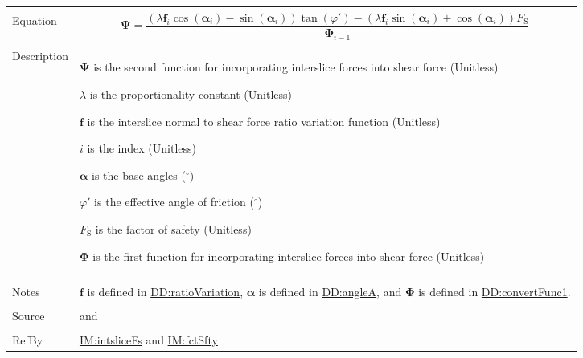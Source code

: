 \documentclass[12pt]{article}
\begin{document}
\begin{minipage}{\textwidth}
\begin{tabular}{>{\raggedright}p{}>{\raggedright\arraybackslash}p{}}
\\ \midrule \\
Equation & \begin{displaymath}
           \symbf{Ψ}=\frac{\left(λ {\symbf{f}}_{i} \cos\left({\symbf{α}}_{i}\right)-\sin\left({\symbf{α}}_{i}\right)\right) \tan\left(φ'\right)-\left(λ {\symbf{f}}_{i} \sin\left({\symbf{α}}_{i}\right)+\cos\left({\symbf{α}}_{i}\right)\right) {F_{\text{S}}}}{{\symbf{Φ}}_{i-1}}
           \end{displaymath}
\\ \midrule \\
Description & \begin{symbDescription}
              \item{$\symbf{Ψ}$ is the second function for incorporating interslice forces into shear force (Unitless)}
              \item{$λ$ is the proportionality constant (Unitless)}
              \item{$\symbf{f}$ is the interslice normal to shear force ratio variation function (Unitless)}
              \item{$i$ is the index (Unitless)}
              \item{$\symbf{α}$ is the base angles (${{}^{\circ}}$)}
              \item{$φ'$ is the effective angle of friction (${{}^{\circ}}$)}
              \item{${F_{\text{S}}}$ is the factor of safety (Unitless)}
              \item{$\symbf{Φ}$ is the first function for incorporating interslice forces into shear force (Unitless)}
              \end{symbDescription}
\\ \midrule \\
Notes & $\symbf{f}$ is defined in \hyperref[DD:ratioVariation]{DD:ratioVariation}, $\symbf{α}$ is defined in \hyperref[DD:angleA]{DD:angleA}, and $\symbf{Φ}$ is defined in \hyperref[DD:convertFunc1]{DD:convertFunc1}.
        
\\ \midrule \\
Source & \cite{chen2005} and \cite{karchewski2012}
         
\\ \midrule \\
RefBy & \hyperref[IM:intsliceFs]{IM:intsliceFs} and \hyperref[IM:fctSfty]{IM:fctSfty}
        
\\ \bottomrule
\end{tabular}
\end{minipage}
\end{document}
